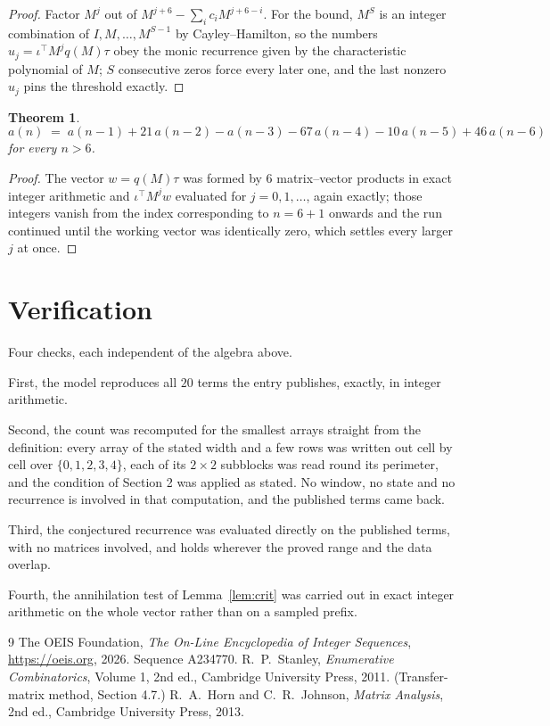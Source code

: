 \documentclass[11pt,a4paper]{article}
\theoremstyle{plain}
\newtheorem{theorem}{Theorem}
\theoremstyle{definition}
\begin{document}
\begin{proof}
Factor $M^{j}$ out of $M^{j+6}-\sum_ic_iM^{j+6-i}$. For the bound, $M^{S}$
is an integer combination of $I,M,\dots,M^{S-1}$ by Cayley--Hamilton, so the numbers
$u_j=\iota^{\!\top}M^{j}q(M)\tau$ obey the monic recurrence given by the characteristic
polynomial of $M$; $S$ consecutive zeros force every later one, and the last nonzero $u_j$
pins the threshold exactly.
\end{proof}

\begin{theorem}
\[
a(n)\;=\;a(n-1) + 21\,a(n-2) - a(n-3) - 67\,a(n-4) - 10\,a(n-5) + 46\,a(n-6)
\]
for every $n>6$.
\end{theorem}

\begin{proof}
The vector $w=q(M)\tau$ was formed by $6$ matrix--vector products in exact integer
arithmetic and $\iota^{\!\top}M^{j}w$ evaluated for $j=0,1,\dots$, again exactly; those
integers vanish from the index corresponding to $n=6+1$ onwards and the run continued
until the working vector was identically zero, which settles every larger $j$ at once.
\end{proof}

\section{Verification}

Four checks, each independent of the algebra above.

First, the model reproduces all $20$ terms the entry publishes, exactly, in integer
arithmetic.

Second, the count was recomputed for the smallest arrays straight from the definition: every
array of the stated width and a few rows was written out cell by cell over $\{0,1,2,3,4\}$, each of
its $2\times2$ subblocks was read round its perimeter, and the condition of Section 2 was
applied as stated. No window, no state and no recurrence is involved in that computation, and
the published terms came back.

Third, the conjectured recurrence was evaluated directly on the published terms, with no
matrices involved, and holds wherever the proved range and the data overlap.

Fourth, the annihilation test of Lemma~\ref{lem:crit} was carried out in exact integer
arithmetic on the whole vector rather than on a sampled prefix.

\begin{thebibliography}{9}
 The OEIS Foundation, \emph{The On-Line Encyclopedia of Integer
Sequences}, \url{https://oeis.org}, 2026. Sequence A234770.
 R.~P.~Stanley, \emph{Enumerative Combinatorics}, Volume 1, 2nd ed.,
Cambridge University Press, 2011. (Transfer-matrix method, Section 4.7.)
 R.~A.~Horn and C.~R.~Johnson, \emph{Matrix Analysis}, 2nd ed., Cambridge
University Press, 2013.
\end{thebibliography}
\end{document}
